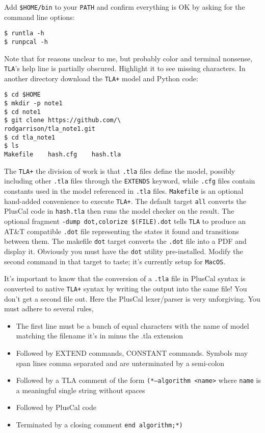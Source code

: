 \documentclass[twocolumn]{article}
\begin{document}
\noindent Add \texttt{\$HOME/bin} to your \texttt{PATH} and confirm everything is OK by asking for the command line options:

\begin{verbatim}
$ runtla -h
$ runpcal -h
\end{verbatim}

\noindent Note that for reasons unclear to me, but probably color and terminal nonsense, \texttt{TLA}'s help line is partially obscured. Highlight it to see missing characters. In another directory download the \texttt{TLA+} model and Python code:

\begin{verbatim}
$ cd $HOME
$ mkdir -p note1
$ cd note1
$ git clone https://github.com/\
rodgarrison/tla_note1.git
$ cd tla_note1
$ ls
Makefile	hash.cfg	hash.tla
\end{verbatim}

The \texttt{TLA+} the division of work is that \texttt{.tla} files define the model, possibly including other \texttt{.tla} files through the \texttt{EXTENDS} keyword, while \texttt{.cfg} files contain constants used in the model referenced in \texttt{.tla} files. \texttt{Makefile} is an optional hand-added convenience to execute \texttt{TLA+}. The default target \texttt{all} converts the PlusCal code in \texttt{hash.tla} then runs the model checker on the result. The optional fragment \texttt{-dump dot,colorize \$(FILE).dot} tells \texttt{TLA} to produce an AT\&T compatible \texttt{.dot} file representing the states it found and transitions between them. The makefile \texttt{dot} target converts the \texttt{.dot} file into a PDF and display it. Obviously you must have the \texttt{dot} utility pre-installed. Modify the second command in that target to taste; it's currently setup for \texttt{MacOS}.

It's important to know that the conversion of a \texttt{.tla} file in PlusCal syntax is converted to native \texttt{TLA+} syntax by writing the output into the same file! You don't get a second file out. Here the PlusCal lexer/parser is very unforgiving. You must adhere to several rules,

\begin{itemize}
\item The first line must be a bunch of equal characters with the name of model matching the filename it's in minus the .tla extension
\item Followed by EXTEND commands, CONSTANT commands. Symbols may span lines comma separated and are unterminated by a semi-colon
\item Followed by a TLA comment of the form \texttt{(*--algorithm <name>} where \texttt{name} is a meaningful single string without spaces
\item Followed by PlusCal code
\item Terminated by a closing comment \texttt{end algorithm;*)}
\end{itemize}
\end{document}
